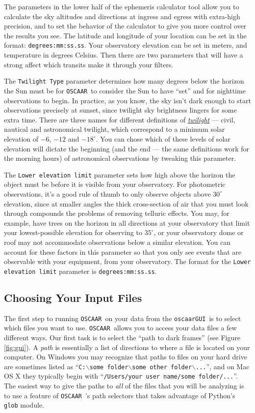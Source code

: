 \documentclass[a4paper]{article}
\newcommand{\code}[1]{\texttt{#1}}
\newcommand{\oscaar}{\code{OSCAAR}~}
\newcommand{\gui}{\code{oscaarGUI}~}
\begin{document}
The parameters in the lower half of the ephemeris calculator tool allow you to calculate the sky altitudes and directions at ingress and egress with extra-high precision, and to set the behavior of the calculator to give you more control over the results you see. The latitude and longitude of your location can be set in the format: \code{degrees:mm:ss.ss}. Your observatory elevation can be set in meters, and temperature in degrees Celsius. Then there are two parameters that will have a strong affect which transits make it through your filters. 

The \code{Twilight Type} parameter determines how many degrees below the horizon the Sun must be for \oscaar to consider the Sun to have ``set'' and for nighttime observations to begin. In practice, as you know, the sky isn't dark enough to start observations precisely at sunset, since twilight sky brightness lingers for some extra time. There are three names for different definitions of \href{http://en.wikipedia.org/wiki/Twilight#Definitions}{\textit{twilight}} --- civil, nautical and astronomical twilight, which correspond to a minimum solar elevation of $-6$, $-12$ and $-18^{\circ}$. You can chose which of these levels of solar elevation will dictate the beginning (and the end --- the same definitions work for the morning hours) of astronomical observations by tweaking this parameter. 

The \code{Lower elevation limit} parameter sets how high above the horizon the object must be before it is visible from your observatory. For photometric observations, it's a good rule of thumb to only observe objects above $30^{\circ}$ elevation, since at smaller angles the thick cross-section of air that you must look through compounds the problems of removing telluric effects.  You may, for example, have trees on the horizon in all directions at your observatory that limit your lowest-possible elevation for observing to $35^{\circ}$, or your observatory dome or roof may not accommodate observations below a similar elevation. You can account for these factors in this parameter so that you only see events that are observable with your equipment, from your observatory. The format for the \code{Lower elevation limit} parameter is  \code{degrees:mm:ss.ss}.

\subsection{Choosing Your Input Files}
The first step to running \oscaar on your data from the \gui is to select which files you want to use. \oscaar allows you to access your data files a few different ways. Our first task is to select the ``path to dark frames'' (see Figure \ref{fig:gui}). A \textit{path} is essentially a list of directions to where a file is located on your computer. On Windows you may recognize that paths to files on your hard drive are sometimes listed as ``\code{C:$\backslash$some folder$\backslash$some other folder$\backslash$...}'', and on Mac OS X they typically begin with ``\code{/Users/your user name/some folder/...}''. The easiest way to give the paths to \textit{all} of the files that you will be analyzing is to use a feature of \oscaar's path selectors that takes advantage of Python's \code{glob} module. 
\end{document}

